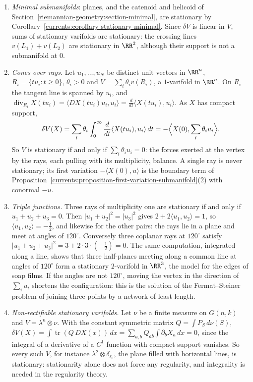 \begin{example}\label{currents:example-stationary}
\begin{enumerate}
\item \emph{Minimal submanifolds}: planes, and the catenoid and helicoid of Section~\ref{riemannian-geometry:section-minimal}, are stationary by Corollary~\ref{currents:corollary-stationary-minimal}. Since $\delta V$
is linear in $V$, sums of stationary varifolds are stationary: the crossing lines $v(L_1) + v(L_2)$ are stationary in $\RR^2$, although their support is not a submanifold at $0$.
\item \emph{Cones over rays.} Let $u_1, \ldots, u_N$ be distinct unit vectors in $\RR^n$, $R_i = \{tu_i : t \geq 0\}$, $\theta_i > 0$ and $V = \sum_i\theta_iv(R_i)$, a $1$-varifold in $\RR^n$. On $R_i$ the tangent line is
spanned by $u_i$, and $\operatorname{div}_{R_i}X(tu_i) = \langle DX(tu_i)u_i, u_i\rangle = \frac{d}{dt}\langle X(tu_i), u_i\rangle$. As $X$ has compact support,
\[
\delta V(X) = \sum_i\theta_i\int_0^\infty\frac{d}{dt}\langle X(tu_i), u_i\rangle\,dt = -\Bigl\langle X(0), \sum_i\theta_iu_i\Bigr\rangle .
\]
So $V$ is stationary if and only if $\sum_i\theta_iu_i = 0$: the forces exerted at the vertex by the rays, each pulling with its multiplicity, balance. A single ray is never stationary; its first variation
$-\langle X(0), u\rangle$ is the boundary term of Proposition~\ref{currents:proposition-first-variation-submanifold}(2) with conormal $-u$.
\item \emph{Triple junctions.} Three rays of multiplicity one are stationary if and only if $u_1 + u_2 + u_3 = 0$. Then $|u_1 + u_2|^2 = |u_3|^2$ gives $2 + 2\langle u_1, u_2\rangle = 1$, so
$\langle u_1, u_2\rangle = -\frac12$, and likewise for the other pairs: the rays lie in a plane and meet at angles of $120^\circ$. Conversely three coplanar rays at $120^\circ$ satisfy
$|u_1 + u_2 + u_3|^2 = 3 + 2 \cdot 3 \cdot (-\frac12) = 0$. The same computation, integrated along a line, shows that three half-planes meeting along a common line at angles of $120^\circ$ form a stationary
$2$-varifold in $\RR^3$, the model for the edges of soap films. If the angles are not $120^\circ$, moving the vertex in the direction of $\sum_iu_i$ shortens the configuration: this is the solution of
the Fermat--Steiner problem of joining three points by a network of least length.
\item \emph{Non-rectifiable stationary varifolds.} Let $\nu$ be a finite measure on $G(n, k)$ and $V = \lambda^n \otimes \nu$. With the constant symmetric matrix $Q = \int P_S\,d\nu(S)$,
$\delta V(X) = \int\operatorname{tr}(Q\,DX(x))\,dx = \sum_{a,b}Q_{ab}\int\partial_bX_a\,dx = 0$, since the integral of a derivative of a $C^1$ function with compact support vanishes. So every such $V$, for instance
$\lambda^2 \otimes \delta_{\ell_0}$, the plane filled with horizontal lines, is stationary: stationarity alone does not force any regularity, and integrality is needed in the regularity theory.
\end{enumerate}
\end{example}

